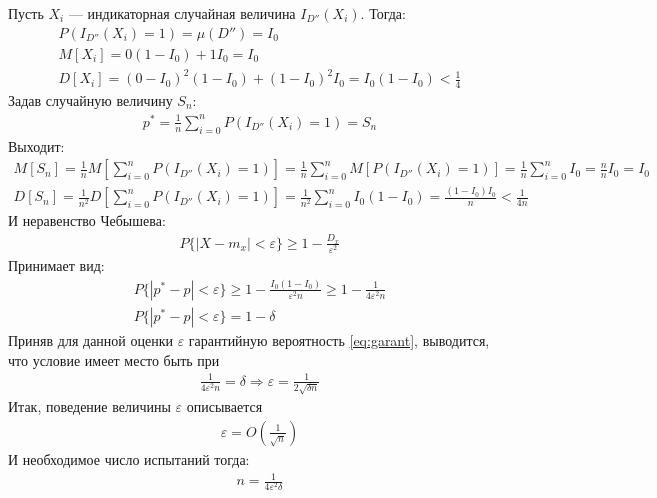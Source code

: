 Пусть \(X_i\) --- индикаторная случайная величина \(I_{D''}(X_i)\). Тогда:
\begin{align}
	P(I_{D''}(X_i)=1) = \mu(D'') = I_0 \\
	M[X_i] = 0(1 - I_0) + 1 I_0 = I_0  \\
	D[X_i] = (0 - I_0)^2 (1 - I_0) + (1 - I_0)^2 I_0 = I_0(1-I_0) < \frac{1}{4}
\end{align}
Задав случайную величину \(S_n\):
\begin{align}
	p^* = \frac{1}{n}\sum_{i=0}^n P(I_{D''}(X_i) = 1) = S_n
\end{align}
Выходит:
\begin{align}
	M[S_n] = \frac{1}{n}M[\sum_{i=0}^n P(I_{D''}(X_i) = 1)] = \frac{1}{n}\sum_{i=0}^n M[P(I_{D''}(X_i) = 1)] = \frac{1}{n}\sum_{i=0}^n I_0 = \frac{n}{n}I_0 = I_0 \\
	D[S_n] = \frac{1}{n^2}D[\sum_{i=0}^n P(I_{D''}(X_i) = 1)] =  \frac{1}{n^2}\sum_{i=0}^n I_0(1-I_0) = \frac{(1 - I_0)I_0}{n} < \frac{1}{4n}
\end{align}
И неравенство Чебышева:
\begin{align}
	P\{|X-m_x|<\varepsilon\} \geq 1 - \frac{D_x}{\varepsilon^2}
\end{align}
Принимает вид:
\begin{align}
	P\{|p^* - p|<\varepsilon\} \geq 1 - \frac{I_0(1-I_0)}{\varepsilon^2 n} \geq 1 - \frac{1}{4 \varepsilon^2 n} \\
	\label{eq:garant}
	P\{|p^* - p|<\varepsilon\} = 1 - \delta
\end{align}
Приняв для данной оценки \(\varepsilon\) гарантийную вероятность \cref{eq:garant}, выводится, что условие имеет место быть при
\begin{align}
	\frac{1}{4 \varepsilon^2 n} = \delta \Longrightarrow \varepsilon = \frac{1}{2\sqrt{\delta n}}
\end{align}
Итак, поведение величины \(\varepsilon\) описывается
\begin{align}\label{eq:o-desc}
	\varepsilon = O(\frac{1}{\sqrt{n}})
\end{align}
И необходимое число испытаний тогда:
\begin{align}
	n = \frac{1}{4 \varepsilon^2 \delta}
\end{align}
